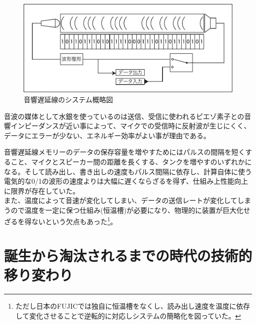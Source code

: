 \documentclass[a4paper,report]{jsbook}
\begin{document}
\begin{figure}[htbp]
\centering
\includegraphics[width=1.00000\textwidth]{./img/adm_setsumei.pdf}
\caption{音響遅延線のシステム概略図\label{fig:adm}}
\end{figure}

音波の媒体として水銀を使っているのは送信、受信に使われるピエゾ素子との音響インピーダンスが近い事によって、マイクでの受信時に反射波が生じにくく、データにエラーが少ない、エネルギー効率がよい事が理由である。

音響遅延線メモリーのデータの保存容量を増やすためにはパルスの間隔を短くすること、マイクとスピーカー間の距離を長くする、タンクを増やすのいずれかになる。そして読み出し、書き出しの速度もパルス間隔に依存し、計算自体に使う電気的な0/1の波形の速度よりは大幅に遅くならざるを得ず、仕組み上性能向上に限界が存在していた。\\
また、温度によって音速が変化してしまい、データの送信レートが変化してしまうので温度を一定に保つ仕組み(恒温槽)が必要になり、物理的に装置が巨大化せざるを得ないという欠点もあった\footnote{ただし日本のFUJICでは独自に恒温槽をなくし、読み出し速度を温度に依存して変化させることで逆転的に対応しシステムの簡略化を図っていた。}。

\section{誕生から淘汰されるまでの時代の技術的移り変わり}\label{ux8a95ux751fux304bux3089ux6dd8ux6c70ux3055ux308cux308bux307eux3067ux306eux6642ux4ee3ux306eux6280ux8853ux7684ux79fbux308aux5909ux308fux308a}
\end{document}
